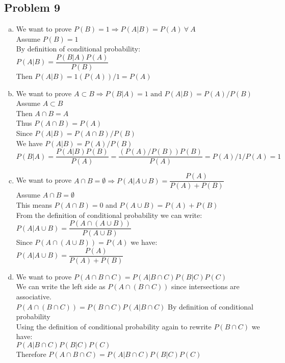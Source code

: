 \documentclass{article}
\begin{document}
\begin{flushleft}
\section*{Problem 9}
\begin{enumerate}[(a)]
\item 
We want to prove $P(B)=1 \Longrightarrow P(A|B)=P(A) \ \forall \ A$\\
Assume $P(B)=1$\\
By definition of conditional probability:\\ $P(A|B)=\dfrac{P(B|A)P(A)}{P(B)}$\\
Then $P(A|B)=1(P(A))/1=P(A)$
\item
We want to prove $A \subset B \Longrightarrow P(B|A)=1 \text{ and } P(A|B)=P(A)/P(B)$\\
Assume $A \subset B$\\
Then $A\cap B=A$\\
Thus $P(A\cap B)=P(A)$\\
Since $P(A|B)=P(A\cap B)/P(B)$\\
We have $P(A|B)=P(A)/P(B)$\\
$P(B|A)=\dfrac{P(A|B)P(B)}{P(A)}=\dfrac{(P(A)/P(B))P(B)}{P(A)}=P(A)/1/P(A)=1$\\
\item
We want to prove $A \cap B=\emptyset \Longrightarrow P(A|A\cup B)=\dfrac{P(A)}{P(A)+P(B)}$\\
Assume $A \cap B=\emptyset$\\
This means $P(A\cap B)=0$ and $P(A\cup B)=P(A)+P(B)$\\
From the definition of conditional probability we can write:\\ $P(A|A\cup B)=\dfrac{P(A\cap (A\cup B))}{P(A\cup B)}$\\
Since $P(A\cap (A\cup B))=P(A)$  we have:\\
$P(A|A\cup B)=\dfrac{P(A)}{P(A)+P(B)}$\\
\item
We want to prove $P(A\cap B \cap C)=P(A|B\cap C)P(B|C)P(C)$\\
We can write the left side as $P(A\cap (B\cap C))$ since intersections are associative.\\
 $P(A\cap (B\cap C))=P(B\cap C)P(A|B\cap C)$ By definition of conditional probability\\
 Using the definition of conditional probability again to rewrite $P(B\cap C)$ we have:\\
 $P(A|B\cap C)P(B|C)P(C)$\\
 Therefore $P(A\cap B \cap C)=P(A|B\cap C)P(B|C)P(C)$
\end{enumerate}

\end{flushleft}
\end{document}
